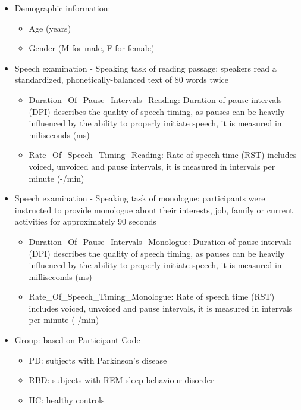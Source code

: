 \documentclass[
  english,
  doc,floatsintext]{apa6}
\providecommand{\tightlist}{%
  \setlength{\itemsep}{0pt}\setlength{\parskip}{0pt}}
\begin{document}
\begin{itemize}
\tightlist
\item
  Demographic information:

  \begin{itemize}
  \tightlist
  \item
    Age (years)
  \item
    Gender (M for male, F for female)
  \end{itemize}
\item
  Speech examination - Speaking task of reading passage: speakers read a standardized, phonetically-balanced text of 80 words twice

  \begin{itemize}
  \tightlist
  \item
    Duration\_Of\_Pause\_Intervals\_Reading: Duration of pause intervals (DPI) describes the quality of speech timing, as pauses can be heavily influenced by the ability to properly initiate speech, it is measured in miliseconds (ms)
  \item
    Rate\_Of\_Speech\_Timing\_Reading: Rate of speech time (RST) includes voiced, unvoiced and pause intervals, it is measured in intervals per minute (-/min)
  \end{itemize}
\item
  Speech examination - Speaking task of monologue: participants were instructed to provide monologue about their interests, job, family or current activities for approximately 90 seconds

  \begin{itemize}
  \tightlist
  \item
    Duration\_Of\_Pause\_Intervals\_Monologue: Duration of pause intervals (DPI) describes the quality of speech timing, as pauses can be heavily influenced by the ability to properly initiate speech, it is measured in milliseconds (ms)
  \item
    Rate\_Of\_Speech\_Timing\_Monologue: Rate of speech time (RST) includes voiced, unvoiced and pause intervals, it is measured in intervals per minute (-/min)
  \end{itemize}
\item
  Group: based on Participant Code

  \begin{itemize}
  \tightlist
  \item
    PD: subjects with Parkinson's disease
  \item
    RBD: subjects with REM sleep behaviour disorder
  \item
    HC: healthy controls
  \end{itemize}
\end{itemize}
\end{document}
